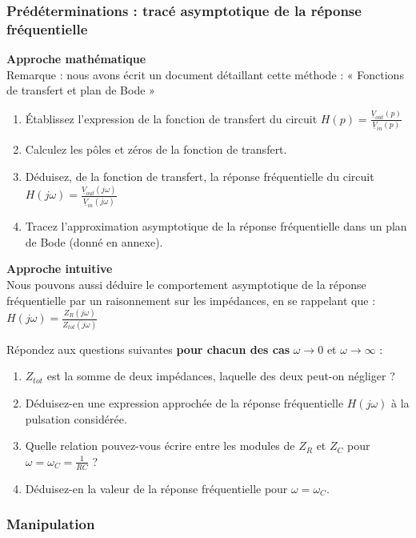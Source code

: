 \documentclass{../template/labo}
\begin{document}
\subsubsection{Prédéterminations : tracé asymptotique de la réponse fréquentielle}\label{sec:predetA}
\begin{predet}
\textbf{Approche mathématique}\\
Remarque : nous avons écrit un document détaillant cette méthode : « Fonctions de transfert et plan de Bode »
\begin{enumerate}
\item Établissez l'expression de la fonction de transfert du circuit $H(p)=\frac{\underline{V}_{out}(p)}{\underline{V}_{in}(p)}$
\item Calculez les pôles et zéros de la fonction de transfert.
\item Déduisez, de la fonction de transfert, la réponse fréquentielle du circuit $H(j\omega)=\frac{\underline{V}_{out}(j\omega)}{\underline{V}_{in}(j\omega)}$
\item Tracez l'approximation asymptotique de la réponse fréquentielle dans un plan de Bode (donné en annexe).
\end{enumerate}

\textbf{Approche intuitive}\\
Nous pouvons aussi déduire le comportement asymptotique de la réponse fréquentielle par un raisonnement sur les impédances, en se rappelant que :
$H(j\omega)=\frac{Z_R(j\omega)}{Z_{tot}(j\omega)}$

\Question
{
Répondez aux questions suivantes \textbf{pour chacun des cas} $\omega \rightarrow 0$ et  $\omega \rightarrow \infty$ :
\begin{enumerate}
\item $Z_{tot}$ est la somme de deux impédances, laquelle des deux peut-on négliger ?
\item Déduisez-en une expression approchée de la réponse fréquentielle $H(j\omega)$ à la pulsation considérée.
\item Quelle relation pouvez-vous écrire entre les modules de $Z_R$ et $Z_C$ pour $\omega = \omega_C=\frac{1}{RC}$ ?
\item Déduisez-en la valeur de la réponse fréquentielle pour $\omega = \omega_C$.
\end{enumerate}
}
{}
\end{predet}

\subsubsection{Manipulation}
\end{document}
